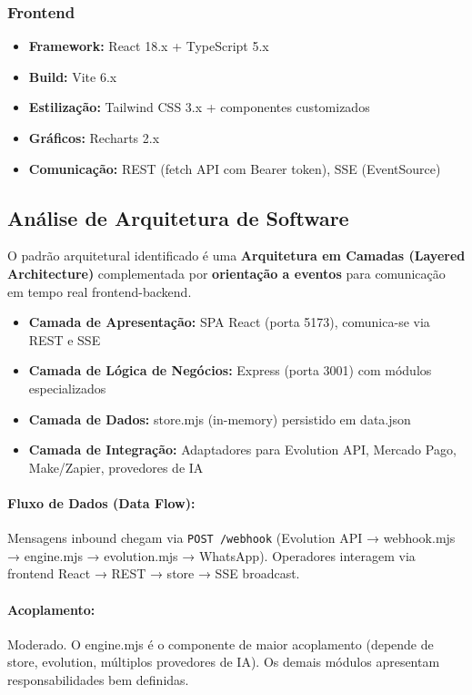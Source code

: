 \documentclass[11pt, a4paper]{article}
\begin{document}
\subsubsection{Frontend}
\begin{itemize}
  \item \textbf{Framework:} React 18.x + TypeScript 5.x
  \item \textbf{Build:} Vite 6.x
  \item \textbf{Estilização:} Tailwind CSS 3.x + componentes customizados
  \item \textbf{Gráficos:} Recharts 2.x
  \item \textbf{Comunicação:} REST (fetch API com Bearer token), SSE (EventSource)
\end{itemize}

\subsection{Análise de Arquitetura de Software}

O padrão arquitetural identificado é uma \textbf{Arquitetura em Camadas (Layered Architecture)} complementada por \textbf{orientação a eventos} para comunicação em tempo real frontend-backend.

\begin{itemize}
  \item \textbf{Camada de Apresentação:} SPA React (porta 5173), comunica-se via REST e SSE
  \item \textbf{Camada de Lógica de Negócios:} Express (porta 3001) com módulos especializados
  \item \textbf{Camada de Dados:} store.mjs (in-memory) persistido em data.json
  \item \textbf{Camada de Integração:} Adaptadores para Evolution API, Mercado Pago, Make/Zapier, provedores de IA
\end{itemize}

\paragraph{Fluxo de Dados (Data Flow):} Mensagens inbound chegam via \texttt{POST /webhook} (Evolution API → webhook.mjs → engine.mjs → evolution.mjs → WhatsApp). Operadores interagem via frontend React → REST → store → SSE broadcast.

\paragraph{Acoplamento:} Moderado. O engine.mjs é o componente de maior acoplamento (depende de store, evolution, múltiplos provedores de IA). Os demais módulos apresentam responsabilidades bem definidas.
\end{document}
